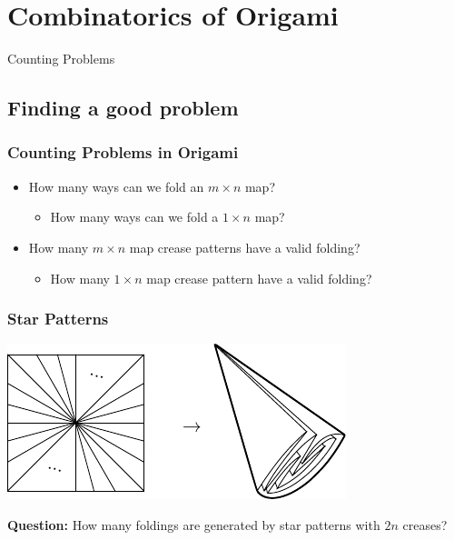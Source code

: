 \documentclass{beamer}
\begin{document}

\section{Combinatorics of Origami}

\newcommand{\R}{\mathsf{R}}
\renewcommand{\L}{\mathsf{L}}

\begin{frame}
	\begin{center}
	\Huge{Counting Problems}
	\end{center}
\end{frame}

\subsection{Finding a good problem}
\begin{frame}
\frametitle{Counting Problems in Origami}
\begin{itemize}
\item How many ways can we fold an $m\times n$ map?
	\begin{itemize}
	\item<2-> How many ways can we fold a $1\times n$ map?
	\end{itemize}
\item How many $m\times n$ map crease patterns have a valid folding?
	\begin{itemize}
	\item<3-> How many $1\times n$ map crease pattern have a valid folding?
	\end{itemize}
\end{itemize}
\end{frame}

\begin{frame}
\frametitle{Star Patterns}
\pause
\begin{center}
\includegraphics[width=.8\textwidth]{meanders/star-cp.pdf}
\end{center}
\pause
\textbf{Question:} How many foldings are generated by star patterns with $2n$ creases?
\end{frame}
\end{document}
